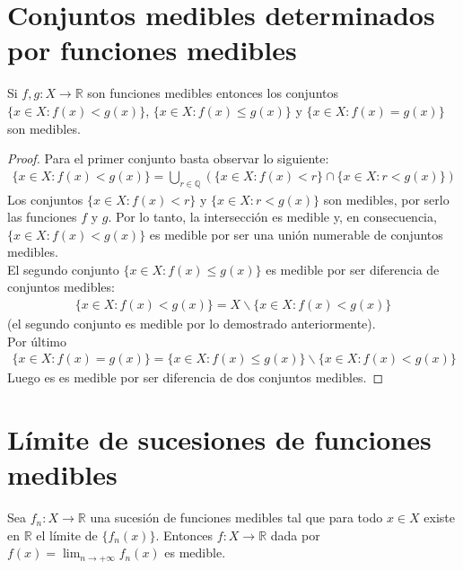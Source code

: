 \section{Conjuntos medibles determinados por funciones medibles}
\begin{prop}
\label{prop:cmedible}
Si $f,g: X \longrightarrow \mathbb{R}$ son funciones medibles entonces los conjuntos $\{ x \in X : f(x) < g(x)\}$, $\{ x \in X : f(x) \leq g(x)\}$ y $\{ x \in X : f(x) = g(x)\}$ son medibles.
\end{prop}
\begin{proof}
Para el primer conjunto basta observar lo siguiente:
\begin{align*}
    \{ x \in X : f(x) < g(x)\} = \bigcup_{r \in \mathbb{Q}}{( \{ x \in X : f(x) < r\} \cap \{ x \in X : r < g(x)\} )} 
\end{align*}
Los conjuntos $\{ x \in X : f(x) < r\}$ y $\{ x \in X : r < g(x)\}$ son medibles, por serlo las funciones $f$ y $g$. Por lo tanto, la intersección es medible y, en consecuencia, $\{ x \in X : f(x) < g(x)\}$ es medible por ser una unión numerable de conjuntos medibles.
\\
\newline
El segundo conjunto $\{ x \in X : f(x) \leq g(x)\}$ es medible por ser diferencia de conjuntos medibles:
\begin{align*}
    \{ x \in X : f(x) < g(x)\} = X \backslash \{ x \in X : f(x) < g(x)\}
\end{align*}
(el segundo conjunto es medible por lo demostrado anteriormente).
\\
\newline
Por último
\begin{align*}
    \{ x \in X : f(x) = g(x)\} = \{ x \in X : f(x) \leq g(x)\} \backslash \{ x \in X : f(x) < g(x)\}
\end{align*}
Luego es es medible por ser diferencia de dos conjuntos medibles.
\end{proof}

\section{Límite de sucesiones de funciones medibles}
\begin{prop}
Sea $f_n: X \longrightarrow \mathbb{R}$ una sucesión de funciones medibles tal que para todo $x \in X$ existe en $\mathbb{R}$ el límite de $\{ f_n(x)\}$. Entonces $f: X \longrightarrow \mathbb{R}$ dada por $f(x) = \lim_{n \to +\infty}{f_n(x)}$ es medible.
\end{prop}

